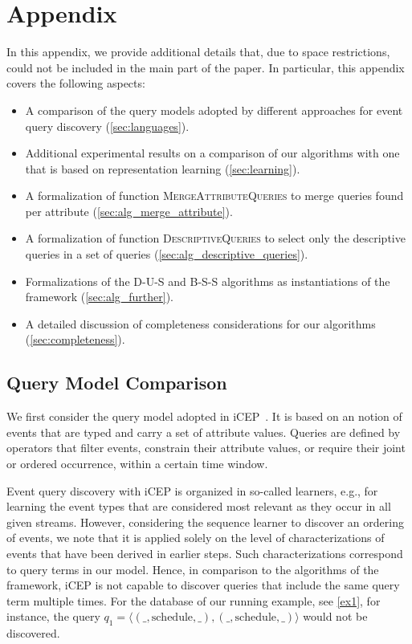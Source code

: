 \appendix
\section{Appendix}
\label{app}

In this appendix, we provide additional details that, due to space
restrictions, could not be included in the main part of the paper. In
particular, this appendix covers the following aspects:
\begin{itemize}[noitemsep,left=1em]
\item A comparison of the query models adopted by different approaches for
event query discovery (\autoref{sec:languages}).
\item Additional experimental results on a comparison of our algorithms with
one that is based on representation learning (\autoref{sec:learning}).
\item A formalization of function \textsc{MergeAttributeQueries} to
merge queries found per attribute (\autoref{sec:alg_merge_attribute}).
\item A formalization of function \textsc{DescriptiveQueries} to select only
the descriptive queries in a set of queries
(\autoref{sec:alg_descriptive_queries}).
\item Formalizations of the D-U-S and B-S-S algorithms as instantiations of
the \sys{} framework (\autoref{sec:alg_further}).
\item A detailed discussion of completeness considerations for our
algorithms (\autoref{sec:completeness}).
\end{itemize}



\subsection{Query Model Comparison}
\label{sec:languages}

We first consider the query model adopted in iCEP~\cite{icep}. It is based
on an notion of events that are typed and carry a set of attribute values.
Queries are defined by operators that filter events, constrain their
attribute values, or require their joint or ordered occurrence, within a
certain time window.

Event query discovery with iCEP is organized in so-called learners, e.g.,
for learning the event types that are considered most relevant as they occur
in all given streams. However, considering the sequence learner to discover
an ordering of events, we note that it is applied solely on the level of
characterizations of events that have been derived in earlier steps. Such
characterizations correspond to query terms in our model. Hence, in
comparison to the algorithms of the \sys{} framework, iCEP is not capable to
discover queries that include the same query term multiple times. For the
database of our running example, see \autoref{ex1}, for instance, the query
$q_1 = \langle (\_,\text{schedule},\_),(\_,\text{schedule},\_)\rangle$
would not be discovered.

